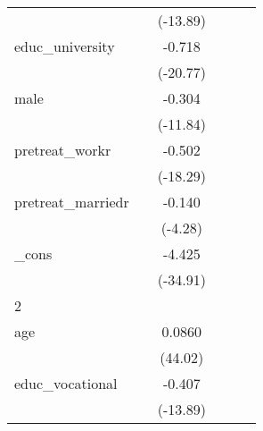 {\begin{tabular}{l*{5}{c}}
            &                     &    (-13.89)         &                     &                     &                     \\
[1em]
educ\_university&                     &      -0.718\sym{***}&                     &                     &                     \\
            &                     &    (-20.77)         &                     &                     &                     \\
[1em]
male        &                     &      -0.304\sym{***}&                     &                     &                     \\
            &                     &    (-11.84)         &                     &                     &                     \\
[1em]
pretreat\_workr&                     &      -0.502\sym{***}&                     &                     &                     \\
            &                     &    (-18.29)         &                     &                     &                     \\
[1em]
pretreat\_marriedr&                     &      -0.140\sym{***}&                     &                     &                     \\
            &                     &     (-4.28)         &                     &                     &                     \\
[1em]
\_cons      &                     &      -4.425\sym{***}&                     &                     &                     \\
            &                     &    (-34.91)         &                     &                     &                     \\
\hline
2           &                     &                     &                     &                     &                     \\
age         &                     &      0.0860\sym{***}&                     &                     &                     \\
            &                     &     (44.02)         &                     &                     &                     \\
[1em]
educ\_vocational&                     &      -0.407\sym{***}&                     &                     &                     \\
            &                     &    (-13.89)         &                     &                     &                     \\

\end{tabular}}
